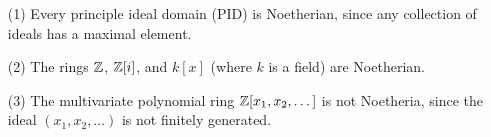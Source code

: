 \begin{example}\label{example_1.1}
    \begin{enumerate}
        \item[(1)] Every principle ideal domain (PID) is Noetherian, since any
            collection of ideals has a maximal element.

        \item[(2)] The rings $\mathbb{Z}$, $\mathbb{Z}[i]$, and $k[x]$ (where $k$ is a field)
            are Noetherian.

        \item[(3)] The multivariate polynomial ring $\mathbb{Z}[x_1, x_2, \dots]$ is not
            Noetheria, since the ideal $(x_1, x_2, \dots)$ is not finitely
            generated.
    \end{enumerate}
\end{example}

